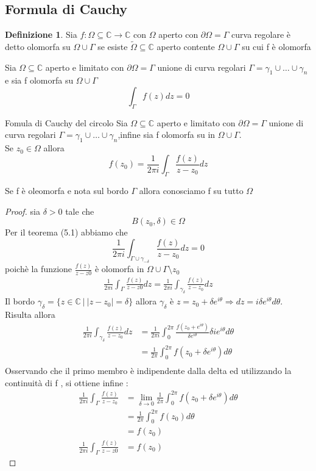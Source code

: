 \documentclass{article}
\theoremstyle{definition}
\newtheorem*{definizione}{Definizione}
\newcommand{\C}{\mathbb{C}}
\newcommand{\norm}[1]{|#1|}
\begin{document}
	\subsection{Formula di Cauchy}
	\begin{definizione}
		Sia $f:\Omega \subseteq \C \rightarrow \C $ con $\Omega$ aperto con $\partial \Omega = \Gamma$ curva regolare è detto olomorfa su $\Omega \cup \Gamma$ se esiste $\tilde{\Omega} \subseteq \C$ aperto contente  $\Omega \cup \Gamma$ su cui f è olomorfa 
	\end{definizione}
	\begin{teo}{}{}
		Sia $\Omega \subseteq \C $ aperto e limitato con $\partial \Omega = \Gamma$ unione di curva regolari $\Gamma=\gamma_1 \cup \dots \cup \gamma_n$ e sia f olomorfa su $\Omega \cup \Gamma$
		$$\int_{\Gamma}f(z)dz=0$$
	\end{teo}
	\begin{teo}{Fomula di Cauchy del circolo}{}
			Sia $\Omega \subseteq \C $ aperto e limitato con $\partial \Omega = \Gamma$ unione di curva regolari $\Gamma=\gamma_1 \cup \dots \cup \gamma_n$,infine sia f olomorfa su in $\Omega \cup \Gamma$. \\ Se $z_0 \in \Omega $ allora 
			$$f(z_0)=\frac{1}{2 \pi i } \int_{\Gamma} \frac{f(z)}{z-z_0}dz $$
	\end{teo}
	Se f è oleomorfa e nota sul bordo $\Gamma$ allora conosciamo f su tutto $\Omega$ 
	\begin{proof}
		sia $\delta > 0$ tale che $$B(z_0 , \delta)\in \Omega$$ Per il teorema (5.1) abbiamo che $$\frac{1}{2 \pi i }\int_{\Gamma \cup \gamma_{-\delta}} \frac{f(z)}{z-z_0}dz=0$$ poichè la funzione $ \frac{f(z)}{z-z0}$ è olomorfa in $\Omega \cup \Gamma \setminus z_0$
		\begin{align*}
			\frac{1}{2 \pi i }\int_{\Gamma} \frac{f(z)}{z-z0}dz=\frac{1}{2 \pi i }\int_{\gamma_{\delta}} \frac{f(z)}{z-z_0}dz
		\end{align*}
		Il bordo $\gamma_\delta= \{z \in \C \ |\ \norm{z-z_0}=\delta\}$ allora $\gamma_{\delta}$ è $z=z_0+\delta e^{i\theta}  \Rightarrow dz=i\delta e^{i\theta}d\theta$. \\Risulta allora 
		\begin{align*}
\frac{1}{2 \pi i }\int_{\gamma_{\delta}} \frac{f(z)}{z-z_0}dz &= \frac{1}{2 \pi i }\int_{0}^{2\pi} \frac{f(z_0+e^{i\theta})}{\delta e^{i\theta }}\delta ie^{i\theta } d\theta \\
&=\frac{1}{2 \pi } \int_{0}^{2\pi}f(z_0+\delta e^{i\theta})d\theta\\
		\end{align*}
		Osservando che il primo membro è indipendente dalla delta ed utilizzando la continuità di f , si ottiene infine :
		\begin{align*}
			\frac{1}{2 \pi i }\int_{\Gamma} \frac{f(z)}{z-z_0}&=\lim_{\delta \rightarrow 0} \frac{1}{2 \pi } \int_{0}^{2\pi}f(z_0+\delta e^{i\theta})d\theta\\ 
			&=\frac{1}{2\pi}\int_{0}^{2\pi}f(z_0)d\theta\\ 
			&= f(z_0) \\
			\frac{1}{2 \pi i }	\int_{\Gamma} \frac{f(z)}{z-z0}&=f(z_0)
		\end{align*}
	\end{proof}
\end{document}
